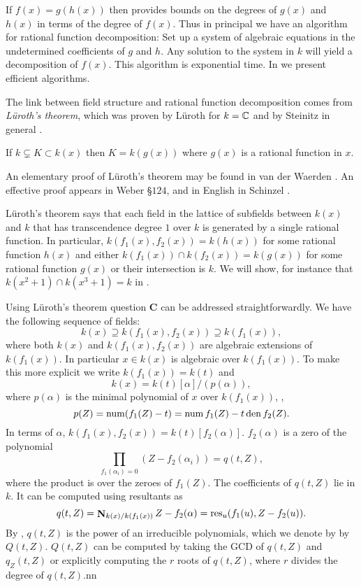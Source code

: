 If $f(x) = g(h(x))$ then  provides
bounds on the degrees of $g(x)$ and $h(x)$ in terms of the degree of
$f(x)$.  Thus in principal we have an algorithm for rational function
decomposition: Set up a system of algebraic equations in the
undetermined coefficients of $g$ and $h$.  Any solution to the system
in $k$ will yield a decomposition of $f(x)$.  This algorithm is
exponential time.  In  we
present efficient algorithms.

\medskip
The link between field structure and rational function decomposition
comes from {\em L\"uroth's theorem\/}, which was proven by L\"uroth
\cite{Luroth1876-za} for $k = \mathbb{C}$ and by Steinitz in general
\cite{Steinitz1910-jj}.

\begin{proposition}[L\"uroth]
\label{Luroths:Prop}
If $k \varsubsetneq K \subset k(x)$ then $K = k(g(x))$ where $g(x)$ is
a rational function in $x$.
\end{proposition}

\noindent
An elementary proof of L\"uroth's theorem may be found in van der
Waerden \cite{Van_der_Waerden1964-sy}.  An effective proof appears in
Weber \cite{Weber1961-tf} \S$124$, and in English in Schinzel
\cite{Schinzel1982-xh}.

L\"uroth's theorem says that each field in the lattice of subfields
between $k(x)$ and $k$ that has transcendence degree $1$ over $k$
is generated by a single rational function.  In particular, $k(f_1(x),
f_2(x)) = k(h(x))$ for some rational function $h(x)$ and either
$k(f_1(x)) \cap k(f_2(x)) = k(g(x))$ for some rational function $g(x)$
or their intersection is $k$.  We will show, for instance that
$k(x^2+1)\cap k(x^3+1) = k$ in . 

Using L\"uroth's theorem question {\bf C} can be addressed
straightforwardly.  We have the following sequence of fields:
\[
k(x) \supseteq k(f_1(x), f_2(x)) \supseteq k(f_1(x)),
\]
where both $k(x)$ and $k(f_1(x), f_2(x))$ are algebraic extensions of
$k(f_1(x))$.  In particular $x \in k(x)$ is algebraic over
$k(f_1(x))$.  To make this more explicit we write $k(f_1(x)) = k(t)$
and
\[
k(x) = k(t)[\alpha]/(p(\alpha)),
\]
where $p(\alpha)$ is the minimal polynomial of $x$ over $k(f_1(x))$,
\ie,
\[
p(Z) = \mathop{\rm num}\nolimits (f_1(Z) - t) = \mathop{\rm num}\nolimits f_1(Z) - t \mathop{\rm den}\nolimits f_2(Z).
\]
In terms of $\alpha$, $k(f_1(x), f_2(x)) = k(t)[f_2(\alpha)]$.  
$f_2(\alpha)$ is a zero of the polynomial
\[
\prod_{f_1(\alpha_i) = 0} \left(Z - f_2(\alpha_i)\right) = q(t, Z),
\]
where the product is over the zeroes of $f_1(Z)$.  The coefficients of
$q(t, Z)$ lie in $k$.  It can be computed using resultants as
\[
q(t, Z) = \mathop{\mathbf{N}}\nolimits_{k(x)/k(f_1(x))} Z - f_2(\alpha) 
        = \mathop{\rm res}\nolimits_u (f_1(u), Z- f_2(u)).
\]
By , $q(t, Z)$ is the power of an irreducible
polynomials, which we denote by by $Q(t, Z)$.  $Q(t, Z)$ can be
computed by taking the GCD of $q(t, Z)$ and $q_Z(t,Z)$ or explicitly
computing the $r$\th{} roots of $q(t,Z)$, where $r$ divides the degree
of $q(t,Z)$.nn

